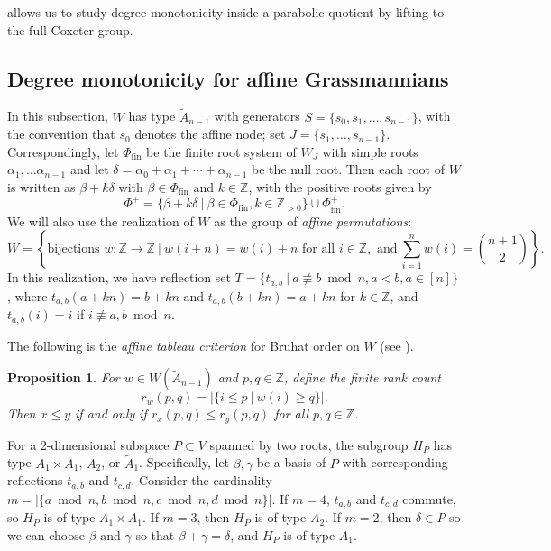\documentclass[11pt]{amsart}
\newtheorem{proposition}[proposition]{Proposition}
\theoremstyle{definition}
\theoremstyle{remark}
\numberwithin{equation}{section}
\newcommand{\Z}{\mathbb Z}
\begin{document}
 allows us to study degree monotonicity inside a parabolic quotient by lifting to the full Coxeter group. 

\subsection{Degree monotonicity for affine Grassmannians}
In this subsection, $W$ has type $\widetilde A_{n-1}$ with generators $S=\{s_0,s_1,\ldots,s_{n-1}\}$, with the convention that $s_0$ denotes the affine node; set $J=\{s_1,\ldots,s_{n-1}\}$. Correspondingly, let  $\Phi_{\mathrm{fin}}$ be the finite root system of $W_J$ with simple roots $\alpha_1,\ldots\alpha_{n-1}$ and let $\delta=\alpha_0+\alpha_1+\cdots+\alpha_{n-1}$ be the null root. Then each root of $W$ is written as $\beta+k\delta$ with $\beta\in\Phi_{\mathrm{fin}}$ and $k\in\Z$, with the positive roots given by \[\Phi^+=\{\beta+k\delta\:|\: \beta\in\Phi_{\mathrm{fin}},k\in\Z_{>0}\}\cup\Phi^+_{\mathrm{fin}}.\]
We will also use the realization of $W$ as the group of \emph{affine permutations}: \[W=\left\{\text{bijections }w:\Z\rightarrow\Z\:\bigg|\: w(i{+}n)=w(i)+n\text{ for all }i\in\Z,\text{ and}\ \sum_{i=1}^n w(i)={n+1\choose 2}\right\}.\]
In this realization, we have reflection set $T=\{t_{a,b}\:|\:a\not\equiv b\bmod n,a<b,a\in[n]\}$, where $t_{a,b}(a+kn)=b+kn$ and $t_{a,b}(b+kn)=a+kn$ for $k\in\Z$, and $t_{a,b}(i)=i$ if $i\not\equiv a,b\bmod n$. 

The following is the \emph{affine tableau criterion} for Bruhat order on $W$ (see \cite[Thm.~8.3.7]{BB}). 
\begin{proposition}\label{prop:tableau-affine-Bruhat}
For $w\in W(\widetilde A_{n-1})$ and $p,q\in\Z$, define the finite rank count \[r_w(p,q)=|\{i\leq p\:|\:w(i)\geq q\}|.\]
Then $x\leq y$ if and only if $r_x(p,q)\leq r_y(p,q)$ for all $p,q\in\Z$.
\end{proposition}

For a $2$-dimensional subspace $P \subset V$ spanned by two roots, the subgroup $H_P$ has type $A_1\times A_1$, $A_2$, or $\widetilde A_1$. Specifically, let $\beta,\gamma$ be a basis of $P$ with corresponding reflections $t_{a,b}$ and $t_{c,d}$. Consider the cardinality $m=|\{a\bmod n, b\bmod n,c\bmod n,d\bmod n\}|$. If $m=4$, $t_{a,b}$ and $t_{c,d}$ commute, so $H_P$ is of type $A_1\times A_1$. If $m=3$, then $H_P$ is of type $A_2$. If $m=2$, then $\delta\in P$ so we can choose $\beta$ and $\gamma$ so that $\beta+\gamma=\delta$, and $H_P$ is of type $\widetilde A_1$.
\end{document}
